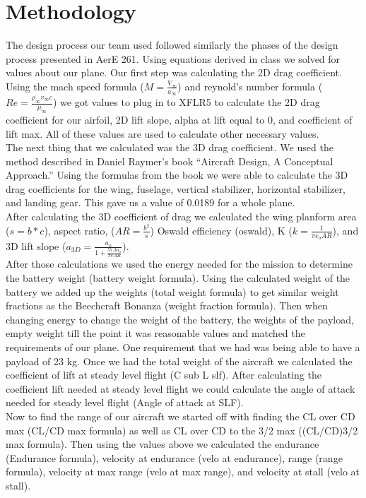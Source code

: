 \documentclass[12pt,A4paper]{article}
\begin{document}
	\section{Methodology}
	\indent The design process our team used followed similarly the phases of the design process presented in AerE 261. Using equations derived in class we solved for values about our plane. Our first step was calculating the 2D drag coefficient. Using the mach speed formula ($M = \frac{V_\infty }{a_\infty}$) and reynold's number formula ($Re = \frac{\rho_\infty v_\infty c}{\mu_\infty}$) we got values to plug in to XFLR5 to calculate the 2D drag coefficient for our airfoil, 2D lift slope, alpha at lift equal to 0, and coefficient of lift max. All of these values are used to calculate other necessary values. \\
	\indent The next thing that we calculated was the 3D drag coefficient. We used the method described in Daniel Raymer's book “Aircraft Design, A Conceptual Approach.” Using the formulas from the book we were able to calculate the 3D drag coefficients for the wing, fuselage, vertical stabilizer, horizontal stabilizer, and landing gear. This gave us a value of 0.0189 for a whole plane. \\
	\indent After calculating the 3D coefficient of drag we calculated the wing planform area ($s = b * c$), aspect ratio, ($AR = \frac{b^2}{s}$) Oswald efficiency (oswald), K ($k = \frac{1}{\pi e_o AR}$), and 3D lift slope ($a_{3D} = \frac{a_o}{1 + \frac{57.3 a_o}{\pi e AR}}$).\\
	\indent After those calculations we used the energy needed for the mission to determine the battery weight (battery weight formula). Using the calculated weight of the battery we added up the weights (total weight formula) to get similar weight fractions as the Beechcraft Bonanza (weight fraction formula). Then when changing energy to change the weight of the battery, the weights of the payload, empty weight till the point it was reasonable values and matched the requirements of our plane. One requirement that we had was being able to have a payload of 23 kg. Once we had the total weight of the aircraft we calculated the coefficient of lift at steady level flight (C sub L slf). After calculating the coefficient lift needed at steady level flight we could calculate the angle of attack needed for steady level flight (Angle of attack at SLF). \\
	\indent Now to find the range of our aircraft we started off with finding the CL over CD max (CL/CD max formula) as well as CL over CD to the 3/2 max ((CL/CD)3/2 max formula). Then using the values above we calculated the endurance (Endurance formula), velocity at endurance (velo at endurance), range (range formula), velocity at max range (velo at max range), and velocity at stall (velo at stall). \\
\end{document}
